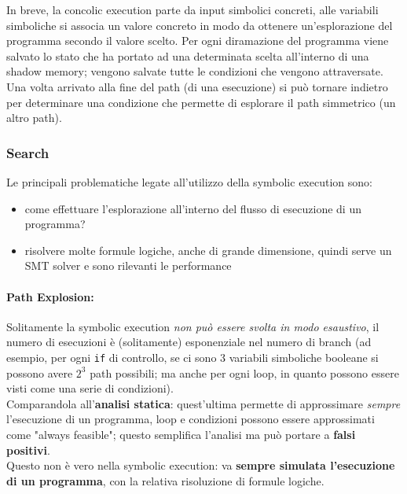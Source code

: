 
In breve, la concolic execution parte da input simbolici concreti, alle variabili simboliche si associa un valore concreto in modo da ottenere un'esplorazione del programma secondo il valore scelto. Per ogni diramazione del programma viene salvato lo stato che ha portato ad una determinata scelta all'interno di una shadow memory; vengono salvate tutte le condizioni che vengono attraversate. Una volta arrivato alla fine del path (di una esecuzione) si può tornare indietro per determinare una condizione che permette di esplorare il path simmetrico (un altro path).\\

\newpage

\subsubsection{Search}

Le principali problematiche legate all'utilizzo della symbolic execution sono:
\begin{itemize}
	\item come effettuare l'esplorazione all'interno del flusso di esecuzione di un programma?
	\item risolvere molte formule logiche, anche di grande dimensione, quindi serve un SMT solver e sono rilevanti le performance
\end{itemize}

\paragraph{Path Explosion:} Solitamente la symbolic execution \textit{non può essere svolta in modo esaustivo}, il numero di esecuzioni è (solitamente) esponenziale nel numero di branch (ad esempio, per ogni \texttt{if} di controllo, se ci sono 3 variabili simboliche booleane si possono avere $2^3$ path possibili; ma anche per ogni loop, in quanto possono essere visti come una serie di condizioni).\\

Comparandola all'\textbf{analisi statica}: quest'ultima permette di approssimare \textit{sempre} l'esecuzione di un programma, loop e condizioni possono essere approssimati come "always feasible"; questo semplifica l'analisi ma può portare a \textbf{falsi positivi}. \\

Questo non è vero nella symbolic execution: va \textbf{sempre simulata l'esecuzione di un programma}, con la relativa risoluzione di formule logiche.\\

